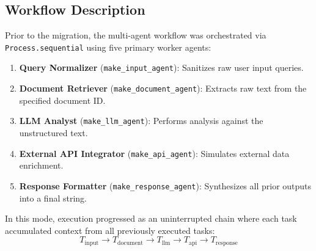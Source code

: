 \documentclass[10pt,a4paper]{article}
\begin{document}
\subsection{Workflow Description}
Prior to the migration, the multi-agent workflow was orchestrated via \texttt{Process.sequential} using five primary worker agents:
\begin{enumerate}
    \item \textbf{Query Normalizer} (\texttt{make\_input\_agent}): Sanitizes raw user input queries.
    \item \textbf{Document Retriever} (\texttt{make\_document\_agent}): Extracts raw text from the specified document ID.
    \item \textbf{LLM Analyst} (\texttt{make\_llm\_agent}): Performs analysis against the unstructured text.
    \item \textbf{External API Integrator} (\texttt{make\_api\_agent}): Simulates external data enrichment.
    \item \textbf{Response Formatter} (\texttt{make\_response\_agent}): Synthesizes all prior outputs into a final string.
\end{enumerate}

\noindent
In this mode, execution progressed as an uninterrupted chain where each task accumulated context from all previously executed tasks:
\[
T_{\text{input}} \longrightarrow T_{\text{document}} \longrightarrow T_{\text{llm}} \longrightarrow T_{\text{api}} \longrightarrow T_{\text{response}}
\]
\end{document}
